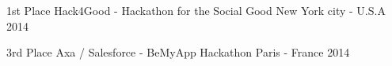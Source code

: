 



\begin{cvhonors}

  \cvhonor
    {1st Place} %
    {Hack4Good -  Hackathon for the Social Good} %
    {New York city - U.S.A} %
    {2014} %

\end{cvhonors}




\begin{cvhonors}

  \cvhonor
    {3rd Place} %
    {Axa / Salesforce - BeMyApp Hackathon} %
    {Paris - France} %
    {2014} %

\end{cvhonors}
